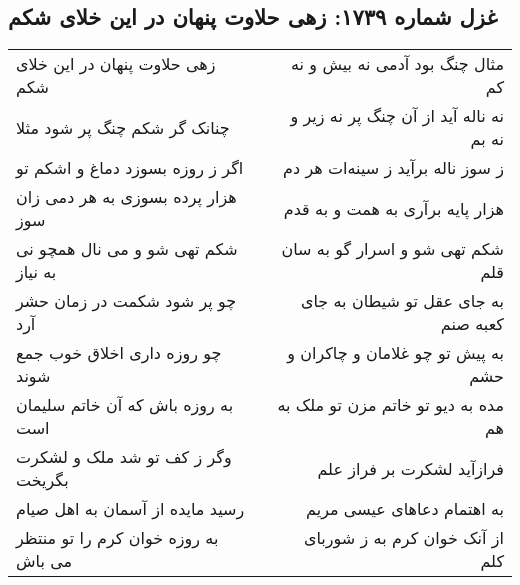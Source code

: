 \begin{center}
\section*{غزل شماره ۱۷۳۹: زهی حلاوت پنهان در این خلای شکم}
\label{sec:1739}
\begin{longtable}{l p{0.5cm} r}
زهی حلاوت پنهان در این خلای شکم
&&
مثال چنگ بود آدمی نه بیش و نه کم
\\
چنانک گر شکم چنگ پر شود مثلا
&&
نه ناله آید از آن چنگ پر نه زیر و نه بم
\\
اگر ز روزه بسوزد دماغ و اشکم تو
&&
ز سوز ناله برآید ز سینه‌ات هر دم
\\
هزار پرده بسوزی به هر دمی زان سوز
&&
هزار پایه برآری به همت و به قدم
\\
شکم تهی شو و می نال همچو نی به نیاز
&&
شکم تهی شو و اسرار گو به سان قلم
\\
چو پر شود شکمت در زمان حشر آرد
&&
به جای عقل تو شیطان به جای کعبه صنم
\\
چو روزه داری اخلاق خوب جمع شوند
&&
به پیش تو چو غلامان و چاکران و حشم
\\
به روزه باش که آن خاتم سلیمان است
&&
مده به دیو تو خاتم مزن تو ملک به هم
\\
وگر ز کف تو شد ملک و لشکرت بگریخت
&&
فرازآید لشکرت بر فراز علم
\\
رسید مایده از آسمان به اهل صیام
&&
به اهتمام دعاهای عیسی مریم
\\
به روزه خوان کرم را تو منتظر می باش
&&
از آنک خوان کرم به ز شوربای کلم
\\
\end{longtable}
\end{center}
